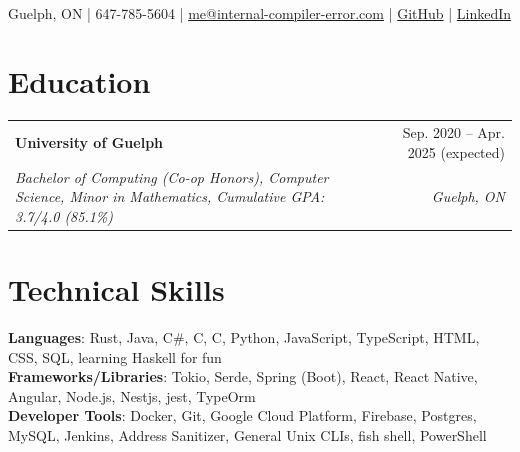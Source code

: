 \documentclass[letterpaper, 10pt]{report}
\makeatletter
\newcommand{\resumeSubheading}[4]{
    \begin{tabular*}{\textwidth}[t]{l@{\extracolsep{\fill}}r}
        \textbf{#1}       & #2                \\
        \textit{\small#3} & \textit{\small#4} \\
    \end{tabular*}\vspace{-0.7em}
}
\newcommand{\cxx}{C\nolinebreak\hspace{-.05em}\raisebox{0.03ex}{\bf +}\nolinebreak\hspace{-.05em}\raisebox{.03ex}{\bf +}}
\makeatother
\begin{document}
\begin{center}
    \textbf{\HUGE\color{Pink}{Liang Wang}} \\ \vspace{1.5em}
    \small Guelph, ON |
    647-785-5604 |
    \href{mailto:me@internal-compiler-error.com}{{me@internal-compiler-error.com}}  |
    \href{https://github.com/Internal-Compiler-Error}{{GitHub}} |
    \href{https://www.linkedin.com/in/liang-wang-225607174/}{{LinkedIn}} \\
\end{center}

\section{Education}
\resumeSubheading{University of Guelph}{Sep. 2020 -- Apr. 2025 (expected)}{Bachelor of Computing (Co-op Honors), Computer Science, Minor in Mathematics, Cumulative GPA: 3.7/4.0 (85.1\%)}{Guelph, ON}


\section{Technical Skills}
\vspace{0.1em}
\begin{itemize}[leftmargin=0em, label={}]
    \small{\item{
        \textbf{Languages}{: Rust, Java, C\#, \cxx, C, Python, JavaScript, TypeScript, HTML, CSS, SQL, learning Haskell for fun} \\
        \textbf{Frameworks/Libraries}{: Tokio, Serde, Spring (Boot), React, React Native, Angular, Node.js, Nestjs, jest, TypeOrm} \\
        \textbf{Developer Tools}{: Docker, Git, Google Cloud Platform, Firebase, Postgres, MySQL, Jenkins, Address Sanitizer, General Unix CLIs, fish shell, PowerShell} \\
    }}
\end{itemize}


\end{document}

